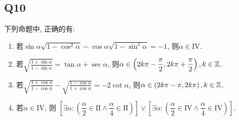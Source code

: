 \documentclass[8pt]{article}
\begin{document}
		\subsection{Q10}
			 下列命题中, 正确的有:

			\begin{enumerate}[label=(\arabic*)]
				\item 若$\sin \alpha \sqrt{1-\cos^2\alpha} - \cos \alpha \sqrt{1-\sin^2\alpha}=-1$, 则$\alpha \in \mathrm{IV}$.
				\item 若$\displaystyle \sqrt{\frac{1+\sin \alpha}{1-\sin \alpha}} = \tan \alpha + \sec \alpha$, 则$\displaystyle \alpha \in \left(2k\pi - \frac{\pi}{2}, 2k\pi + \frac{\pi}{2}\right), k \in \mathbb{Z}$.
				\item 若$\displaystyle \sqrt{\frac{1+\cos \alpha}{1-\cos \alpha}} - \sqrt{\frac{1-\cos \alpha}{1+\cos \alpha}}=-2\cot \alpha$, 则$\displaystyle \alpha \in \left(2k\pi - \pi, 2k\pi\right), k \in \mathbb{Z}$.
				\item 若$\alpha \in \mathrm{IV}$, 则 $\left[\exists \alpha: \left(\dfrac{\alpha}{2} \in \mathrm{II} \wedge \dfrac{\alpha}{4} \in \mathrm{II}\right)\right] \vee \left[\exists \alpha: \left(\dfrac{\alpha}{2} \in \mathrm{IV} \wedge \dfrac{\alpha}{4} \in \mathrm{IV}\right)\right]$.
			\end{enumerate}
\end{document}
